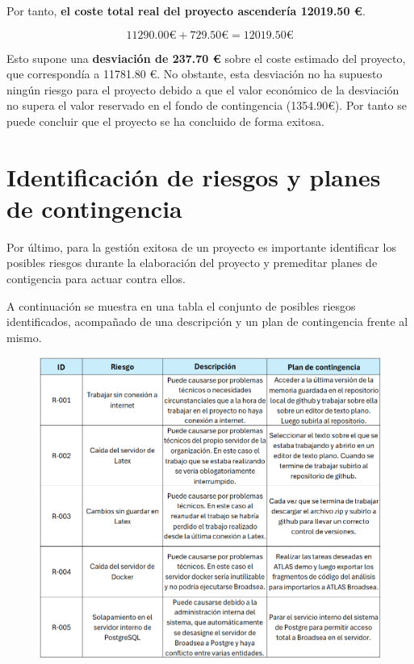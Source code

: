 Por tanto,\textbf{ el coste total real del proyecto ascendería  12019.50 €}.

\begin{equation}
    11290.00\text{€} + 729.50\text{€} =  12019.50 \text{€}
\end{equation}

Esto supone una\textbf{ desviación de 237.70 €} sobre el coste estimado del proyecto, que correspondía a 11781.80 €. No obstante, esta desviación no ha supuesto ningún riesgo para el proyecto debido a que el valor económico de la desviación no supera el valor reservado en el fondo de contingencia (1354.90€). Por tanto se puede concluir que el proyecto se ha concluido de forma exitosa. 

\section{Identificación de riesgos y planes de contingencia} \label{sec:03Riesgos}

Por último, para la gestión exitosa de un proyecto es importante identificar los posibles riesgos durante la elaboración del proyecto y premeditar planes de contigencia para actuar contra ellos. 

A continuación se muestra en una tabla el conjunto de posibles riesgos identificados, acompañado de una descripción y un plan de contingencia frente al mismo.

\begin{figure}[H]
    \centering
    \includegraphics[width=1\textwidth]{tables/tablaRiesgos.png}
    \label{table:tablaRiesgos}
\end{figure}

